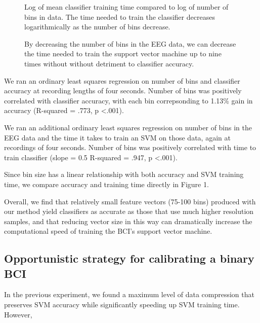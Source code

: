  \begin{figure}[!h]
  \vspace{-0.2cm}
  \centering
   {}
  \caption{Log of mean classifier training time compared to log of number of bins in data. The time needed to train the classifier decreases logarithmically as the number of bins decrease.}
  \label{fig:fig1b}
  \vspace{-0.1cm}
 \end{figure}

\begin{figure}[!h]
  \vspace{-0.2cm}
  \centering
   {}
  \caption{ By decreasing the number of bins in the EEG data, we can decrease the time needed to train the support vector machine up to nine times without without detriment to classifier accuracy. }
  \label{fig:fig1c}
  \vspace{-0.1cm}
 \end{figure}

We ran an ordinary least squares regression on number of bins and classifier accuracy at recording lengths of four seconds. Number of bins was positively correlated with classifier accuracy, with each bin correpsonding to 1.13\% gain in accuracy (R-squared = .773, p \textless .001). 

We ran an additional ordinary least squares regression on number of bins in the EEG data and the time it takes to train an SVM on those data, again at recordings of four seconds. Number of bins was positively correlated with time to train classifier (slope = 0.5 R-squared = .947, p \textless .001).

Since bin size has a linear relationship with both accuracy and SVM training time, we compare accuracy and training time directly in Figure 1. 

Overall, we find that relatively small feature vectors (75-100 bins) produced with our method yield classifiers as accurate as those that use much higher resolution samples, and that reducing vector size in this way can dramatically increase the computational speed of training the BCI's support vector machine. 


\subsection{Opportunistic strategy for calibrating a binary BCI}

In the previous experiment, we found a maximum level of data compression that preserves SVM accuracy while significantly speeding up SVM training time. However, 

